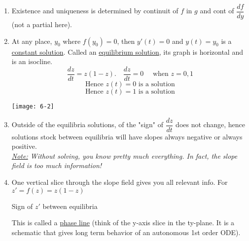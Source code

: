 \begin{enumerate}[label=\protect\circled{\Roman*}]
	\item Existence and uniqueness is determined by continuit of $f$ in $g$ and cont of $\dfrac{df}{dy}$ (not a partial here). 
	\item At any place, $y_0$ where $f(y_0) = 0$, then $y'(t) = 0$ and $y(t) = y_0$ is a \underline{constant solution}. Called an \underline{equilibrium solution}, its graph is horizontal and is an isocline.
		\begin{equation*}
			\dfrac{dz}{dt} = z(1-z). \quad \dfrac{dz}{dt} = 0 \quad \text{ when } z=0,1
		\end{equation*}
		\begin{equation*}
			\text{Hence } z(t) = 0 \text{ is a solution}
		\end{equation*}
		\begin{equation*}
			\text{Hence } z(t) = 1 \text{ is a solution}
		\end{equation*}
		\begin{center}
			\texttt{[image: 6-2]}
		\end{center}
	\item Outside of the equilibria solutions, of the "sign" of $\dfrac{dz}{dt}$ does not change, hence solutions stock between equilibria will have slopes always negative or always positive.\\
	{\small \textit{\underline{Note:} Without solving, you know pretty much everything. In fact, the slope field is too much information!}}
	\item One vertical slice through the slope field gives you all relevant info. For $z' = f(z) = z(1-z)$
	\begin{center}
	\begin{center}
		Sign of $z'$ between equilibria
	\end{center}
	\end{center}
	This is called a \underline{phase line} (think of the y-axis slice in the ty-plane. It is a schematic that gives long term behavior of an autonomous 1st order ODE).
	\begin{example-N}

\end{example-N}
\end{enumerate}
